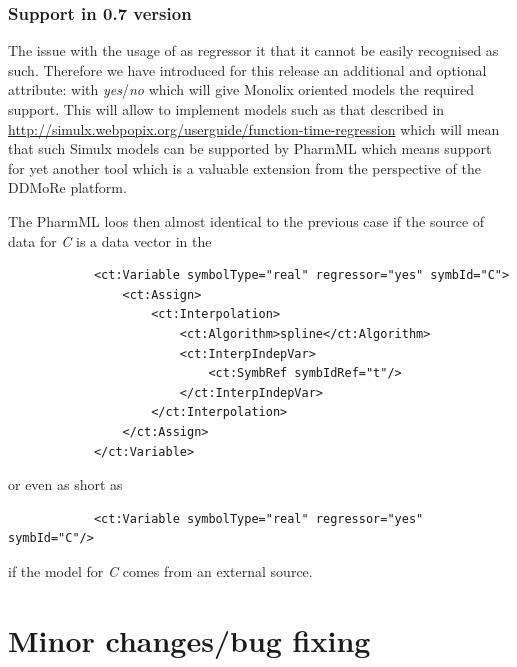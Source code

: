\subsubsection{Support in 0.7 version}
The issue with the usage of  as regressor it that it cannot be 
easily recognised as such. Therefore we have introduced for this release 
an additional and optional attribute:  with \emph{yes}/\emph{no} 
which will give Monolix oriented models the required support. 
This will allow to implement models such as that described in
\url{http://simulx.webpopix.org/userguide/function-time-regression}
which will mean that such Simulx models can be supported by PharmML
which means support for yet another tool which is a valuable extension from the
perspective of the DDMoRe platform. 

The PharmML loos then almost identical to the previous case if the source of
data for \emph{C} is a data vector in the 
\lstset{language=XML}
\begin{lstlisting}
            <ct:Variable symbolType="real" regressor="yes" symbId="C">
                <ct:Assign>
                    <ct:Interpolation>
                        <ct:Algorithm>spline</ct:Algorithm>
                        <ct:InterpIndepVar>
                            <ct:SymbRef symbIdRef="t"/>
                        </ct:InterpIndepVar>
                    </ct:Interpolation>
                </ct:Assign>
            </ct:Variable>
\end{lstlisting}
or even as short as
\lstset{language=XML}
\begin{lstlisting}
            <ct:Variable symbolType="real" regressor="yes" symbId="C"/>
\end{lstlisting}
if the model for \emph{C} comes from an external source.

\section{Minor changes/bug fixing}

